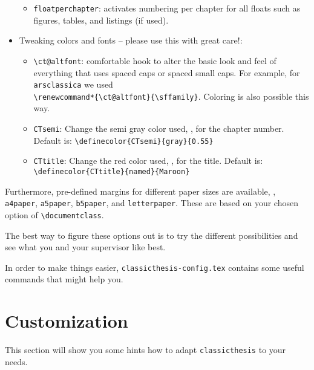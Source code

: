 \begin{itemize}
\begin{itemize}
              \item\texttt{floatperchapter}: activates numbering per chapter for
                    all floats such as figures, tables, and listings (if used).
          \end{itemize}

    \item Tweaking colors and fonts -- please use this with great care!:
          \begin{itemize}
              \item\verb|\ct@altfont|: comfortable hook to alter the basic look and feel of everything that uses spaced caps or spaced small caps. For example, for \texttt{arsclassica} we used \\ \verb|\renewcommand*{\ct@altfont}{\sffamily}|. Coloring is also possible this way.


              \item\texttt{CTsemi}: Change the semi gray color used, \eg, for the chapter number. Default is: \verb|\definecolor{CTsemi}{gray}{0.55}|

              \item\texttt{CTtitle}: Change the red color used, \eg, for the title. Default is: \verb|\definecolor{CTtitle}{named}{Maroon}|

          \end{itemize}

\end{itemize}

Furthermore, pre-defined margins for different paper sizes are available, \eg, \texttt{a4paper}, \texttt{a5paper}, \texttt{b5paper}, and \texttt{letterpaper}. These are based on your chosen option of \verb|\documentclass|.

The best way to figure these options out is to try the different
possibilities and see what you and your supervisor like best.

In order to make things easier, \texttt{classicthesis-config.tex}
contains some useful commands that might help you.


\section{Customization}\label{sec:custom}
This section will show you some hints how to adapt
\texttt{classicthesis} to your needs.

